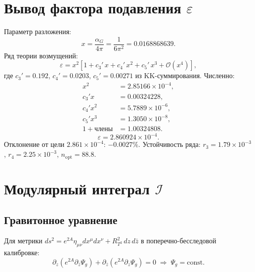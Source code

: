 \documentclass[12pt,a4paper]{article}
\numberwithin{equation}{section}
\begin{document}
\section{Вывод фактора подавления $\varepsilon$}

Параметр разложения:
\begin{equation}
x = \frac{\alpha_G}{4\pi} = \frac{1}{6\pi^2} = 0.0168868639.
\end{equation}
Ряд теории возмущений:
\begin{equation}
\boxed{\;\varepsilon = x^2\left[1 + c_3'\,x + c_4'\,x^2 + c_5'\,x^3 
+ \mathcal{O}(x^4)\right],\;}
\end{equation}
где $c_3' = 0.192$, $c_4' = 0.0203$, $c_5' = 0.00271$ из 
KK-суммирования. Численно:
\begin{align}
x^2 &= 2.85166\times 10^{-4},\\
c_3'x &= 0.00324228,\\
c_4'x^2 &= 5.7889\times 10^{-6},\\
c_5'x^3 &= 1.3050\times 10^{-8},\\
1 + \text{члены} &= 1.00324808.
\end{align}
\begin{equation}
\boxed{\;\varepsilon = 2.860924\times 10^{-4}.\;}
\end{equation}
Отклонение от цели $2.861\times 10^{-4}$: $-0.0027\%$. Устойчивость ряда: 
$r_3 = 1.79\times 10^{-3}$, $r_4 = 2.25\times 10^{-3}$, 
$n_{\text{opt}} = 88.8$.

\section{Модулярный интеграл $\mathcal{I}$}

\subsection{Гравитонное уравнение}
Для метрики $ds^2 = e^{2A}\eta_{\mu\nu}dx^\mu dx^\nu + R_{T^2}^2\,dz\,d\bar z$ 
в поперечно-бесследовой калибровке:
\begin{equation}
\partial_z(e^{2A}\partial_{\bar z}\Psi_g) + 
\partial_{\bar z}(e^{2A}\partial_z\Psi_g) = 0 \;\Longrightarrow\; 
\Psi_g = \text{const}.
\end{equation}
\end{document}

